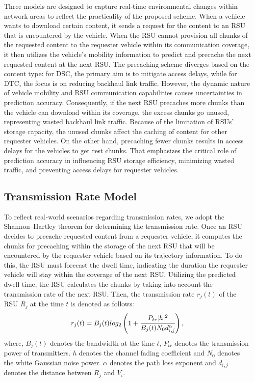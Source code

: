 \documentclass[journal]{IEEEtran}
\begin{document}
Three models are designed to capture real-time environmental changes within network areas to reflect the practicality of the proposed scheme.
When a vehicle wants to download certain content, it sends a request for the content to an RSU that is encountered by the vehicle.
When the RSU cannot provision all chunks of the requested content to the requester vehicle within its communication coverage, it then utilizes the vehicle's mobility information to predict and precache the next requested content at the next RSU.
The precaching scheme diverges based on the content type: for DSC, the primary aim is to mitigate access delays, while for DTC, the focus is on reducing backhaul link traffic.
However, the dynamic nature of vehicle mobility and RSU communication capabilities causes uncertainties in prediction accuracy.
Consequently, if the next RSU precaches more chunks than the vehicle can download within its coverage, the excess chunks go unused, representing wasted backhaul link traffic.
Because of the limitation of RSUs' storage capacity, the unused chunks affect the caching of content for other requester vehicles.
On the other hand, precaching fewer chunks results in access delays for the vehicles to get rest chunks.
That emphasizes the critical role of prediction accuracy in influencing RSU storage efficiency, minimizing wasted traffic, and preventing access delays for requester vehicles.



\subsection{Transmission Rate Model}
To reflect real-world scenarios regarding transmission rates, we adopt the Shannon–Hartley theorem for determining the transmission rate.
Once an RSU decides to precache requested content from a requester vehicle, it computes the chunks for precaching within the storage of the next RSU that will be encountered by the requester vehicle based on its trajectory information.
To do this, the RSU must forecast the dwell time, indicating the duration the requester vehicle will stay within the coverage of the next RSU.
Utilizing the predicted dwell time, the RSU calculates the chunks by taking into account the transmission rate of the next RSU.
Then, the transmission rate $r_{j}(t)$ of the RSU $R_{j}$ at the time $t$ is denoted as follows:
\begin{equation}
    r_{j}(t)=B_{j}(t)log_{2}\left( 1+\cfrac {P_{tr}|h|^{2}} {B_{j}(t) N_{0} d_{i, j}^{\alpha}} \right), %
\end{equation}
where, $B_{j}(t)$ denotes the bandwidth at the time $t$, $P_{tr}$ denotes the transmission power of transmitters.
$h$ denotes the channel fading coefficient and $N_{0}$ denotes the white Gaussian noise power.
$\alpha$ denotes the path loss exponent and $d_{i,j}$ denotes the distance between $R_{j}$ and $V_{i}$.
\end{document}

